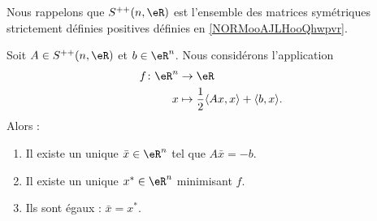 Nous rappelons que \( S^{++}(n,\eR)\) est l'ensemble des matrices symétriques strictement définies positives définies en \ref{NORMooAJLHooQhwpvr}.
\begin{proposition}     \label{PROPooYRLDooTwzfWU}
    Soit \( A\in S^{++}(n,\eR)\) et \( b\in \eR^n\). Nous considérons l'application
    \begin{equation}
        \begin{aligned}
            f\colon \eR^n&\to \eR \\
            x&\mapsto \frac{ 1 }{2}\langle Ax, x\rangle +\langle b, x\rangle . 
        \end{aligned}
    \end{equation}
    Alors :
    \begin{enumerate}
        \item
            Il existe un unique \( \bar x\in \eR^n\) tel que \( A\bar x=-b\).
        \item
            Il existe un unique \( x^*\in \eR^n\) minimisant \( f\).
        \item
            Ils sont égaux : \( \bar x=x^*\).
    \end{enumerate}
\end{proposition}

